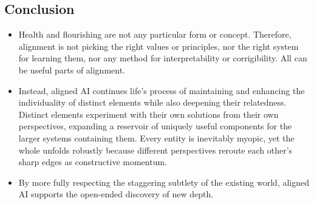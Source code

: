 \documentclass[11pt]{article}
\begin{document}
\subsection*{Conclusion}

\begin{itemize}
  \item Health and flourishing are not any particular form or concept. Therefore, alignment is not picking the right values or principles, nor the right system for learning them, nor any method for interpretability or corrigibility. All can be useful parts of alignment.
  \item Instead, aligned AI continues life's process of maintaining and enhancing the individuality of distinct elements while also deepening their relatedness. Distinct elements experiment with their own solutions from their own perspectives, expanding a reservoir of uniquely useful components for the larger systems containing them. Every entity is inevitably myopic, yet the whole unfolds robustly because different perspectives reroute each other's sharp edges as constructive momentum. 
  \item By more fully respecting the staggering subtlety of the existing world, aligned AI supports the open-ended discovery of new depth.

\end{itemize}







\end{document}
